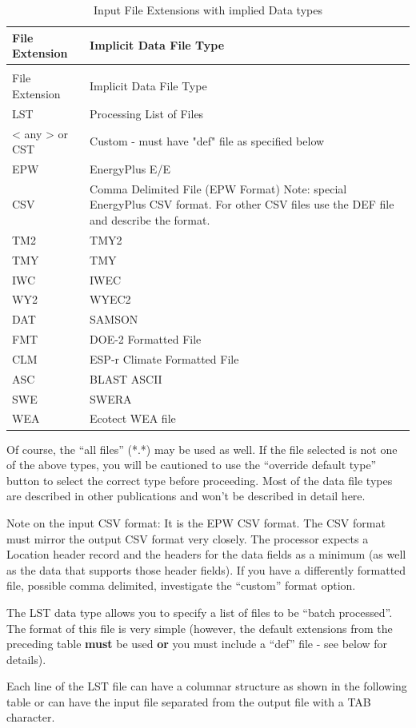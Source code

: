 \begin{longtable}[c]{p{1.5in}p{4.5in}}
\caption{Input File Extensions with implied Data types \label{table:input-file-extensions-with-implied-data-types}} \tabularnewline
\toprule 
File Extension & Implicit Data File Type \tabularnewline \midrule
\endfirsthead

\caption[]{Input File Extensions with implied Data types} \tabularnewline
\toprule 
File Extension & Implicit Data File Type \tabularnewline \midrule
\endhead

LST & Processing List of Files \tabularnewline
< any >  or CST & Custom - must have "def" file as specified below \tabularnewline
EPW & EnergyPlus E/E \tabularnewline
CSV & Comma Delimited File (EPW Format) Note: special EnergyPlus CSV format. For other CSV files use the DEF file and describe the format. \tabularnewline
TM2 & TMY2 \tabularnewline
TMY & TMY \tabularnewline
IWC & IWEC \tabularnewline
WY2 & WYEC2 \tabularnewline
DAT & SAMSON \tabularnewline
FMT & DOE-2 Formatted File \tabularnewline
CLM & ESP-r Climate Formatted File \tabularnewline
ASC & BLAST ASCII \tabularnewline
SWE & SWERA \tabularnewline
WEA & Ecotect WEA file \tabularnewline
\bottomrule
\end{longtable}

Of course, the ``all files'' (*.*) may be used as well. If the file selected is not one of the above types, you will be cautioned to use the ``override default type'' button to select the correct type before proceeding. Most of the data file types are described in other publications and won't be described in detail here.

Note on the input CSV format: It is the EPW CSV format. The CSV format must mirror the output CSV format very closely. The processor expects a Location header record and the headers for the data fields as a minimum (as well as the data that supports those header fields). If you have a differently formatted file, possible comma delimited, investigate the ``custom'' format option.

The LST data type allows you to specify a list of files to be ``batch processed''. The format of this file is very simple (however, the default extensions from the preceding table \textbf{must} be used \textbf{or} you must include a ``def'' file - see below for details).

Each line of the LST file can have a columnar structure as shown in the following table or can have the input file separated from the output file with a TAB character.


